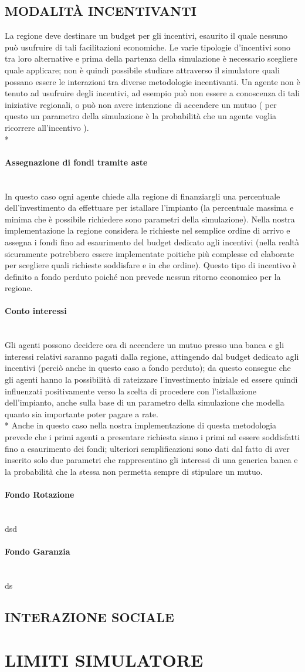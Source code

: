 \documentclass[12pt,a4paper,openright,twoside]{report}
\newcommand{\myparagraph}[1]{\paragraph{#1}\mbox{}\\}
\begin{document}
\subsection{MODALITÀ INCENTIVANTI}

La regione deve destinare un budget per gli incentivi, esaurito il quale nessuno può usufruire di tali facilitazioni economiche. Le varie tipologie d’incentivi sono tra loro alternative e prima della partenza della simulazione è necessario scegliere quale applicare; non è quindi possibile studiare attraverso il simulatore quali possano essere le interazioni tra diverse metodologie incentivanti. Un agente non è tenuto ad usufruire degli incentivi, ad esempio può non essere a conoscenza di tali iniziative regionali, o può non avere intenzione di accendere un mutuo ( per questo un parametro della simulazione è la probabilità che un agente voglia ricorrere all’incentivo ). \\*

\myparagraph{Assegnazione di fondi tramite aste}

In questo caso ogni agente chiede alla regione di finanziargli una percentuale dell'investimento da effettuare per istallare l'impianto (la percentuale massima e minima che è possibile richiedere sono parametri della simulazione). Nella nostra implementazione la regione considera le richieste nel semplice ordine di arrivo e assegna i fondi fino ad esaurimento del budget dedicato agli incentivi (nella realtà sicuramente potrebbero essere implementate poitiche più complesse ed elaborate per scegliere quali richieste soddisfare e in che ordine). Questo tipo di incentivo è definito a fondo perduto poiché non prevede nessun ritorno economico per la regione.

\myparagraph{Conto interessi}

Gli agenti possono decidere ora di accendere un mutuo presso una banca e gli interessi relativi saranno pagati dalla regione, attingendo dal budget dedicato agli incentivi (perciò anche in questo caso a fondo perduto); da questo consegue che gli agenti hanno la possibilità di rateizzare l'investimento iniziale ed essere quindi influenzati positivamente verso la scelta di procedere con l'istallazione dell'impianto, anche sulla base di un parametro della simulazione che modella quanto sia importante poter pagare a rate.\\*
Anche in questo caso nella nostra implementazione di questa metodologia prevede che i primi agenti a presentare richiesta siano i primi ad essere soddisfatti fino a esaurimento dei fondi; ulteriori semplificazioni sono dati dal fatto di aver inserito solo due parametri che rappresentino gli interessi di una generica banca e la probabilità che la stessa non permetta sempre di stipulare un mutuo.

\myparagraph{Fondo Rotazione}

dsd

\myparagraph{Fondo Garanzia}

ds

\subsection{INTERAZIONE SOCIALE}


\section{LIMITI SIMULATORE}

\nocite{*}


\end{document}
